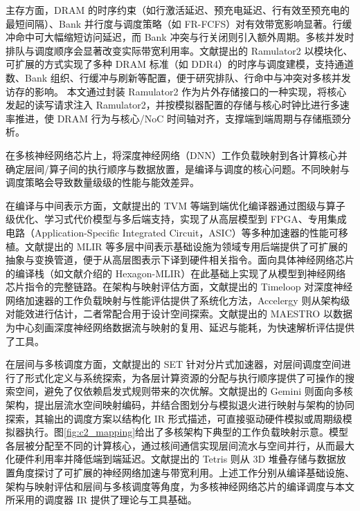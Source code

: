 
主存方面，DRAM 的时序约束（如行激活延迟、预充电延迟、行有效至预充电的最短间隔）、Bank 并行度与调度策略（如 FR-FCFS）对有效带宽影响显著。行缓冲命中可大幅缩短访问延迟，而 Bank 冲突与行关闭则引入额外周期。多核并发时排队与调度顺序会显著改变实际带宽利用率。文献\parencite{luo2023ramulator2}提出的 Ramulator2 以模块化、可扩展的方式实现了多种 DRAM 标准（如 DDR4）的时序与调度建模，支持通道数、Bank 组织、行缓冲与刷新等配置，便于研究排队、行命中与冲突对多核并发访存的影响。 本文通过封装 Ramulator2 作为片外存储接口的一种实现，将核心发起的读写请求注入 Ramulator2，并按模拟器配置的存储与核心时钟比进行多速率推进，使 DRAM 行为与核心/NoC 时间轴对齐，支撑端到端周期与存储瓶颈分析。



在多核神经网络芯片上，将深度神经网络（DNN）工作负载映射到各计算核心并确定层间/算子间的执行顺序与数据放置，是编译与调度的核心问题。不同映射与调度策略会导致数量级级的性能与能效差异。

在编译与中间表示方面，文献\parencite{chen2018tvm}提出的 TVM 等端到端优化编译器通过图级与算子级优化、学习式代价模型与多后端支持，实现了从高层模型到 FPGA、专用集成电路（Application-Specific Integrated Circuit，ASIC）等多种加速器的性能可移植。文献\parencite{lattner2021mlir}提出的 MLIR 等多层中间表示基础设施为领域专用后端提供了可扩展的抽象与变换管道，便于从高层图表示下译到硬件相关指令。面向具体神经网络芯片的编译栈（如文献\parencite{qualcomm2026hexagonmlir}介绍的 Hexagon-MLIR）在此基础上实现了从模型到神经网络芯片指令的完整链路。在架构与映射评估方面，文献\parencite{parashar2019timeloop,wu2019accelergy}提出的 Timeloop 对深度神经网络加速器的工作负载映射与性能评估提供了系统化方法，Accelergy 则从架构级对能效进行估计，二者常配合用于设计空间探索。文献\parencite{kwon2019maestro}提出的 MAESTRO 以数据为中心刻画深度神经网络数据流与映射的复用、延迟与能耗，为快速解析评估提供了工具。

在层间与多核调度方面，文献\parencite{set2023isca}提出的 SET 针对分片式加速器，对层间调度空间进行了形式化定义与系统探索，为各层计算资源的分配与执行顺序提供了可操作的搜索空间，避免了仅依赖启发式规则带来的次优解。文献\parencite{cai2024gemini}提出的 Gemini 则面向多核架构，提出层流水空间映射编码，并结合图划分与模拟退火进行映射与架构的协同探索，其输出的调度方案以结构化 IR 形式描述，可直接驱动硬件模拟或周期级模拟器执行。图\ref{fig:c2_mapping}给出了多核架构下典型的工作负载映射示意。模型各层被分配至不同的计算核心，通过核间通信实现层间流水与空间并行，从而最大化硬件利用率并降低端到端延迟。文献\parencite{gao2017tetris}提出的 Tetris 则从 3D 堆叠存储与数据放置角度探讨了可扩展的神经网络加速与带宽利用。上述工作分别从编译基础设施、架构与映射评估和层间与多核调度等角度，为多核神经网络芯片的编译调度与本文所采用的调度器 IR 提供了理论与工具基础。

